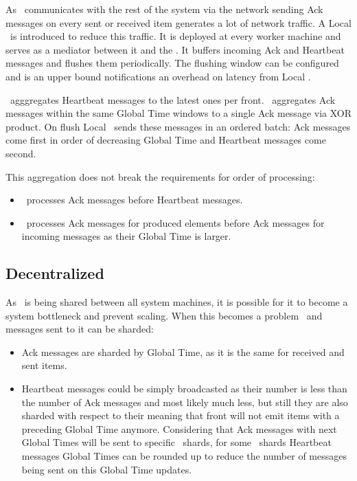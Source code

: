 As \tracker\ communicates with the rest of the system via the network sending Ack messages on every sent or received item generates a lot of network traffic. A Local \tracker\ is introduced to reduce this traffic. It is deployed at every worker machine and serves as a mediator between it and the \tracker. It buffers incoming Ack and Heartbeat messages and flushes them periodically. The flushing window can be configured and  is an upper bound notifications an overhead on latency from Local \tracker.

\tracker\ agggregates Heartbeat messages to the latest ones per front. \tracker\ aggregates Ack messages within the same Global Time windows to a single Ack message via XOR product. On flush Local \tracker\ sends these messages in an ordered batch: Ack messages come first in order of decreasing Global Time and Heartbeat messages come second.

This aggregation does not break the requirements for order of processing:
\begin{itemize}
	\item \tracker\ processes Ack messages before Heartbeat messages.
	\item \tracker\ processes Ack messages for produced elements before Ack messages for incoming messages as their Global Time is larger.
\end{itemize}

\subsection{Decentralized \tracker\ }

As \tracker\ is being shared between all system machines, it is possible for it to become a system bottleneck and prevent scaling. When this becomes a problem \tracker\ and messages sent to it can be sharded:
\begin{itemize}
	\item Ack messages are sharded by Global Time, as it is the same for received and sent items.
	\item Heartbeat messages could be simply broadcasted as their number is less than the number of Ack messages and most likely much less, but still they are also sharded with respect to their meaning that front will not emit items with a preceding Global Time anymore. Considering that Ack messages with next Global Times will be sent to specific \tracker\ shards, for some \tracker\ shards Heartbeat messages Global Times can be rounded up to reduce the number of messages being sent on this Global Time updates.
\end{itemize}

